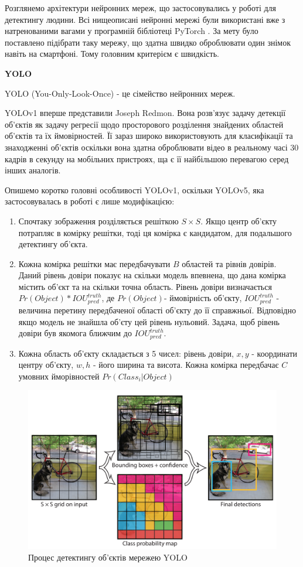 Розглянемо архітектури нейронних мереж, що застосовувались у роботі
для детектингу людини. Всі нищеописані нейронні мережі були використані вже з
натренованими вагами у програмній бібліотеці PyTorch \cite{NEURIPS2019_9015}.
За мету було поставлено підібрати таку мережу, що здатна швидко оброблювати 
один знімок навіть на смартфоні. Тому головним критерієм є швидкість.

\textbf{YOLO}

YOLO (You-Only-Look-Once) - це сімейство нейронних мереж.

YOLOv1 вперше представили Joseph Redmon. 
Вона розв'язує задачу детекції об'єктів як задачу регресії
щодо просторового розділення знайдених областей об'єктів та їх
ймовірностей. Її зараз широко використовують для класифікації та знаходженні об'єктів
оскільки вона здатна оброблювати відео в реальному часі 30 кадрів в секунду 
на мобільних пристроях, ща є її найбільшою перевагою серед інших аналогів.

Опишемо коротко головні особливості YOLOv1, оскільки YOLOv5, яка застосовувалась 
в роботі є лише модифікацією:
\begin{enumerate}
    \item Спочтаку зображення розділяється решіткою $S \times S$.
          Якщо центр об'єкту потрапляє в комірку решітки, тоді ця комірка
          є кандидатом, для подальшого детектингу об'єкта.
    \item Кожна комірка решітки має передбачувати $B$ областей та рівнів
          довірів. Даний рівень довіри показує на скільки модель впевнена,
          що дана комірка містить об'єкт та на скільки точна область.
          Рівень довіри визначається $Pr(Object)*{IOU}_{pred}^{truth}$, 
          де $Pr(Object)$- ймовірність об'єкту, ${IOU}_{pred}^{truth}$ - величина
          перетину передбаченої області об'єкту до її справжньої.
          Відповідно якщо модель не знайшла об'єту цей рівень нульовий.
          Задача, щоб рівень довіри був якомога ближчим до ${IOU}_{pred}^{truth}$.
    \item Кожна область об'єкту складається з 5 чисел: рівень довіри,
          $x, y$ - координати центру об'єкту,  $w, h$ - його ширина та висота.
          Кожна комірка передбачає $C$ умовних йморівностей $Pr(Class_i|Object)$
\end{enumerate}

\begin{figure}[H]
    \includegraphics[width=0.5\linewidth]{images/cnn_yolo1}
    \centering
    \caption{Процес детектингу об'єктів мережею YOLO \cite{RedmonYolo}
    }
\end{figure}

